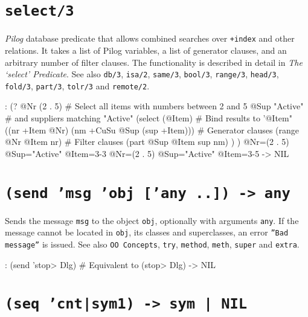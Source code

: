  
\section*{\texttt{select/3}}
\label{sec:func-ref-S-select/3}


\emph{Pilog} database predicate that allows combined
searches over \texttt{+index} and other relations. It takes a list of Pilog
variables, a list of generator clauses, and an arbitrary number of
filter clauses. The functionality is described in detail in
\emph{The `select' Predicate}. See also \texttt{db/3}, \texttt{isa/2},
\texttt{same/3}, \texttt{bool/3}, \texttt{range/3}, \texttt{head/3}, \texttt{fold/3}, \texttt{part/3}, \texttt{tolr/3}
and \texttt{remote/2}.


\begin{wideverbatim}
: (?
   @Nr (2 . 5)          # Select all items with numbers between 2 and 5
   @Sup "Active"        # and suppliers matching "Active"
   (select (@Item)                                  # Bind results to '@Item"
      ((nr +Item @Nr) (nm +CuSu @Sup (sup +Item)))  # Generator clauses
      (range @Nr @Item nr)                          # Filter clauses
      (part @Sup @Item sup nm) ) )
 @Nr=(2 . 5) @Sup="Active" @Item={3-3}
 @Nr=(2 . 5) @Sup="Active" @Item={3-5}
-> NIL
\end{wideverbatim}

 
\section*{\texttt{(send 'msg 'obj ['any ..]) -> any}}
\label{sec:func-ref-S-(send 'msg 'obj ['any ..]) -> any}


Sends the message \texttt{msg} to the object \texttt{obj}, optionally with arguments
\texttt{any}. If the message cannot be located in \texttt{obj}, its classes and
superclasses, an error \texttt{''Bad message''} is issued. See also
\texttt{OO Concepts}, \texttt{try}, \texttt{method}, \texttt{meth}, \texttt{super} and \texttt{extra}.


\begin{wideverbatim}
: (send 'stop> Dlg)  # Equivalent to (stop> Dlg)
-> NIL
\end{wideverbatim}

 
\section*{\texttt{(seq 'cnt|sym1) -> sym | NIL}}
\label{sec:func-ref-S-(seq 'cnt|sym1) -> sym | NIL}


